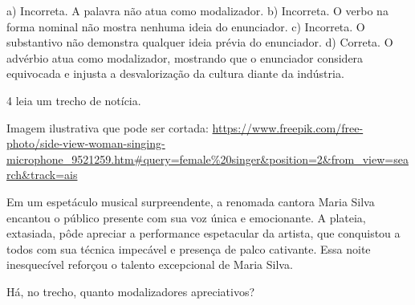 \begin{escolha}
\begin{escolha}
\begin{escolha}
\begin{escolha}
\begin{escolha}
\begin{escolha}
\begin{escolha}
\begin{escolha}
\begin{escolha}
\begin{escolha}
\begin{escolha}
a) Incorreta. A palavra não atua como modalizador. b) Incorreta. O verbo
na forma nominal não mostra nenhuma ideia do enunciador. c) Incorreta. O
substantivo não demonstra qualquer ideia prévia do enunciador. d)
Correta. O advérbio atua como modalizador, mostrando que o enunciador
considera equivocada e injusta a desvalorização da cultura diante da
indústria.

\num{4} leia um trecho de notícia.

Imagem ilustrativa que pode ser cortada:
\url{https://www.freepik.com/free-photo/side-view-woman-singing-microphone_9521259.htm\#query=female\%20singer\&position=2\&from_view=search\&track=ais}

Em um espetáculo musical surpreendente, a renomada cantora Maria Silva
encantou o público presente com sua voz única e emocionante. A plateia,
extasiada, pôde apreciar a performance espetacular da artista, que
conquistou a todos com sua técnica impecável e presença de palco
cativante. Essa noite inesquecível reforçou o talento excepcional de
Maria Silva.

Há, no trecho, quanto modalizadores apreciativos?

\end{escolha}
\end{escolha}
\end{escolha}
\end{escolha}
\end{escolha}
\end{escolha}
\end{escolha}
\end{escolha}
\end{escolha}
\end{escolha}
\end{escolha}
